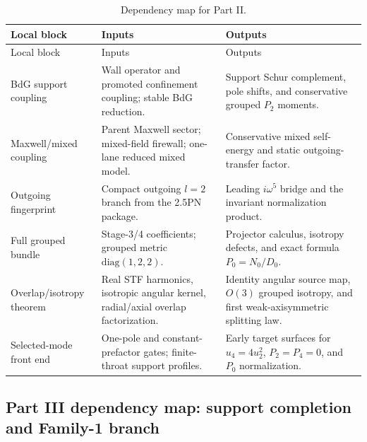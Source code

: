 \begin{longtable}{L{0.18\textwidth}L{0.29\textwidth}L{0.35\textwidth}}
\caption{Dependency map for Part II.}\label{tab:dep-part-ii}\\
\toprule
Local block & Inputs & Outputs \\
\midrule
\endfirsthead
\toprule
Local block & Inputs & Outputs \\
\midrule
\endhead
BdG support coupling & Wall operator and promoted confinement coupling; stable BdG reduction. & Support Schur complement, pole shifts, and conservative grouped \(P_2\) moments. \\
\addlinespace
Maxwell/mixed coupling & Parent Maxwell sector; mixed-field firewall; one-lane reduced mixed model. & Conservative mixed self-energy and static outgoing-transfer factor. \\
\addlinespace
Outgoing fingerprint & Compact outgoing \(l=2\) branch from the 2.5PN package. & Leading \(i\omega^5\) bridge and the invariant normalization product. \\
\addlinespace
Full grouped bundle & Stage-3/4 coefficients; grouped metric \(\mathrm{diag}(1,2,2)\). & Projector calculus, isotropy defects, and exact formula \(P_0=N_0/D_0\). \\
\addlinespace
Overlap/isotropy theorem & Real STF harmonics, isotropic angular kernel, radial/axial overlap factorization. & Identity angular source map, \(O(3)\) grouped isotropy, and first weak-axisymmetric splitting law. \\
\addlinespace
Selected-mode front end & One-pole and constant-prefactor gates; finite-throat support profiles. & Early target surfaces for \(u_4=4u_2^2\), \(P_2=P_4=0\), and \(P_0\) normalization. \\
\bottomrule
\end{longtable}

\subsection{Part III dependency map: support completion and Family-1 branch}
\label{subsec:dep-part-iii}

